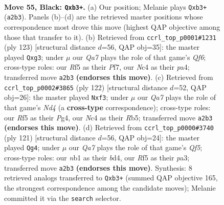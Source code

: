 \documentclass[11pt]{article}
\begin{document}
\clearpage

\begin{figure}[p]\centering
\begin{subfigure}{0.46\textwidth}\centering
\resizebox{\linewidth}{!}{%
\newchessgame
\chessboard[
  setfen={8/2k4p/8/p4r2/2np4/1R1K4/q3P3/1N6 b - - 5 55},
  showmover=false,
  pgfstyle=straightmove, color=movearrow, markmove={a2-b3}
]}
\caption{}
\end{subfigure}\hfill
\begin{subfigure}{0.46\textwidth}\centering
\resizebox{\linewidth}{!}{%
\newchessgame
\chessboard[
  setfen={8/5p1k/8/pP6/P3p3/4PqN1/3R2N1/6K1 b - - 2 62},
  showmover=false,
  pgfstyle=straightmove, color=movearrow, markmove={f3-g3}
]}
\caption{}
\end{subfigure}
\\[4pt]
\begin{subfigure}{0.46\textwidth}\centering
\resizebox{\linewidth}{!}{%
\newchessgame
\chessboard[
  setfen={8/4p2p/k7/PR4p1/3N1nP1/5r2/8/4K3 w - - 2 62},
  showmover=false,
  pgfstyle=straightmove, color=movearrow, markmove={d4-f3}
]}
\caption{}
\end{subfigure}\hfill
\begin{subfigure}{0.46\textwidth}\centering
\resizebox{\linewidth}{!}{%
\newchessgame
\chessboard[
  setfen={5k2/8/p6p/7P/3B1q2/P1R2N2/3pK3/8 b - - 0 61},
  showmover=false,
  pgfstyle=straightmove, color=movearrow, markmove={f4-g4}
]}
\caption{}
\end{subfigure}
\caption{\textbf{Move 55, Black: \texttt{Qxb3+}.} (a) Our position; Melanie plays \texttt{Qxb3+} (\texttt{a2b3}). Panels (b)--(d) are the retrieved master positions whose correspondence most drove this move (highest QAP objective among those that transfer to it). (b) Retrieved from \texttt{ccrl\_top\_p0001\#1231} (ply 123) [structural distance $d$=56, QAP obj=35]: the master played \texttt{Qxg3}; under $\mu$ our \emph{Qa7} plays the role of that game's \emph{Qf6}; cross-type roles: our \emph{R}f5 as their \emph{P}f7, our \emph{N}c4 as their \emph{p}a4; transferred move \texttt{a2b3} \textbf{(endorses this move)}. (c) Retrieved from \texttt{ccrl\_top\_p0002\#3865} (ply 122) [structural distance $d$=52, QAP obj=26]: the master played \texttt{Nxf3}; under $\mu$ our \emph{Qa7} plays the role of that game's \emph{Nd4} (a \textbf{cross-type} correspondence); cross-type roles: our \emph{R}f5 as their \emph{P}g4, our \emph{N}c4 as their \emph{R}b5; transferred move \texttt{a2b3} \textbf{(endorses this move)}. (d) Retrieved from \texttt{ccrl\_top\_p0000\#3740} (ply 121) [structural distance $d$=56, QAP obj=24]: the master played \texttt{Qg4}; under $\mu$ our \emph{Qa7} plays the role of that game's \emph{Qf5}; cross-type roles: our \emph{n}b1 as their \emph{b}d4, our \emph{R}f5 as their \emph{p}a3; transferred move \texttt{a2b3} \textbf{(endorses this move)}. Synthesis: 8 retrieved analogs transferred to \texttt{Qxb3+} (summed QAP objective 165, the strongest correspondence among the candidate moves); Melanie committed it via the \texttt{search} selector.}
\label{fig:thought-m109}
\end{figure}
\end{document}
